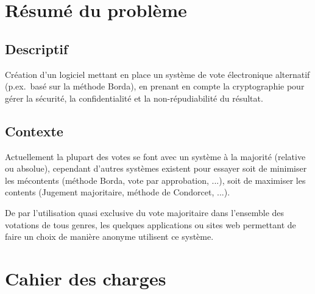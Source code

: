 \documentclass[../report]{subfiles}
\begin{document}
\section{Résumé du problème}
\subsection{Descriptif}
Création d'un logiciel mettant en place un système de vote électronique alternatif (p.ex.~basé sur la méthode Borda), en prenant en compte la cryptographie pour gérer la sécurité, la confidentialité et la non-répudiabilité du résultat.

\subsection{Contexte}
Actuellement la plupart des votes se font avec un système à la majorité (relative ou absolue), cependant d'autres systèmes existent pour essayer soit de minimiser les mécontents (méthode Borda, vote par approbation, ...), soit de maximiser les contents (Jugement majoritaire, méthode de Condorcet, ...).

De par l'utilisation quasi exclusive du vote majoritaire dans l'ensemble des votations de tous genres, les quelques applications ou sites web permettant de faire un choix de manière anonyme utilisent ce système.

\section{Cahier des charges}
\end{document}
